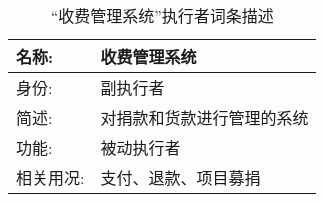 \begin{table}[H]  
\caption{“收费管理系统”执行者词条描述}  
\begin{center}  
    \begin{tabular}{l p{11cm}} 
        \hline
        \quad 名称:  &  收费管理系统 \\
        \hline
        \quad 身份:  & 副执行者 \\
        \hline
        \quad 简述:  & 对捐款和货款进行管理的系统 \\
        \hline
        \quad 功能:  & 被动执行者 \\
        \hline
        \quad 相关用况:  & 支付、退款、项目募捐 \\
        \hline
    \end{tabular}
\end{center}
\end{table}